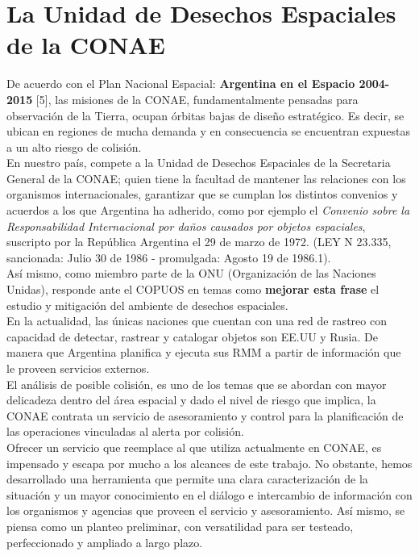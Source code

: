 \section{La Unidad de Desechos Espaciales de la CONAE}
De acuerdo con el Plan Nacional Espacial: {\bf{ Argentina en el Espacio 2004-2015}} [5], las misiones de la CONAE, fundamentalmente pensadas para observaci\'on de la Tierra, ocupan \'orbitas bajas de dise\~no estrat\'egico. Es decir, se ubican en regiones de mucha demanda y en consecuencia se encuentran expuestas a un alto riesgo de colisi\'on.\\
En nuestro pa\'is, compete a la Unidad de Desechos Espaciales de la Secretaria General de la CONAE; quien tiene la facultad de mantener las relaciones con los organismos internacionales, garantizar que se cumplan los distintos convenios y acuerdos a los que Argentina ha adherido, como por ejemplo el {\it{Convenio sobre la Responsabilidad Internacional por da\~nos causados por objetos espaciales}}, suscripto por la Rep\'ublica Argentina el 29 de marzo de 1972. (LEY N 23.335, sancionada: Julio 30 de 1986 - promulgada: Agosto 19 de 1986.1).\\
 As\'i mismo, como miembro parte de la ONU (Organizaci\'on de las Naciones Unidas), responde ante el \ac{COPUOS} en temas como {\bf{mejorar esta frase}} el estudio y mitigaci\'on del ambiente de desechos espaciales.\\

En la actualidad, las \'unicas naciones que cuentan con una red de rastreo con capacidad de detectar, rastrear y catalogar objetos son EE.UU y Rusia. De manera que Argentina planifica y ejecuta sus RMM a partir de informaci\'on que le proveen servicios externos.\\

El an\'alisis de posible colisi\'on, es uno de los temas que se abordan con mayor delicadeza dentro del \'area espacial y dado el nivel de riesgo que implica, la CONAE contrata un servicio de asesoramiento y control para la planificaci\'on de las operaciones vinculadas al alerta por colisi\'on.\\
Ofrecer un servicio que reemplace al que utiliza actualmente en CONAE, es impensado y escapa por mucho a los alcances de este trabajo. No obstante, hemos desarrollado una herramienta que permite una clara caracterizaci\'on de la situaci\'on y un mayor conocimiento en el di\'alogo e intercambio de informaci\'on con los organismos y agencias que proveen el servicio y asesoramiento. As\'i mismo, se piensa como un planteo preliminar, con versatilidad para ser testeado, perfeccionado y ampliado a largo plazo.\\


